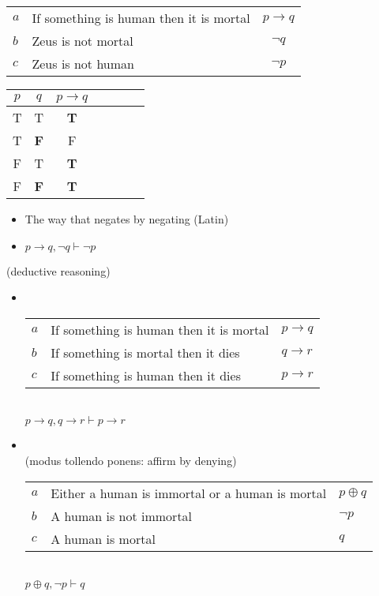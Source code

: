 \documentclass[headrule,footrule]{foils}
\begin{document}
\begin{center}
  \begin{tabular}{llc}
    $a$ & If something is human then it is mortal & $p  \rightarrow q$\\
    $b$ & Zeus is not mortal  & $\neg q$ \\ \hline
    $c$ & Zeus is not human   & $\neg p$
  \end{tabular}

  \begin{tabular}{|c|c|c|c|c|c|c|}
    \hline
    $p$ & $q$ & $p \rightarrow q$  \\
    \hline
    T & T & \textbf{T}  \\ 
    T & \textbf{F} & F  \\ 
    F & T & \textbf{T}  \\ 
    \rowcolor{Gray}
    F & \textbf{F} & \textbf{T}  \\ 
    \hline
  \end{tabular}
\end{center}
\begin{itemize}
\item  The way that negates by negating (Latin)
\item $p \rightarrow q, \neg q \vdash \neg p$
\end{itemize}

(deductive reasoning)
\begin{itemize}
\item {}
\\[2ex]
 \begin{tabular}{lll}
    $a$ & If something is human then it is mortal &  $p \rightarrow q$ \\
    $b$ & If something is mortal then it dies & $q \rightarrow r$ \\ \hline
    $c$ & If something is human then it dies &  $p \rightarrow r$
  \end{tabular}
\\ $p \rightarrow q, q \rightarrow r \vdash p \rightarrow r$

\item {}
\\ (modus tollendo ponens: affirm by denying)
\\[2ex]
 \begin{tabular}{lll}
    $a$ & Either a human is immortal or a human is mortal & $p \oplus q$ \\
    $b$ & A human is not immortal  & $ \neg p $ \\ \hline
    $c$ & A human is mortal & $q$
  \end{tabular}
\\ $p \oplus q, \neg p \vdash q$
\end{itemize}
\end{document}
